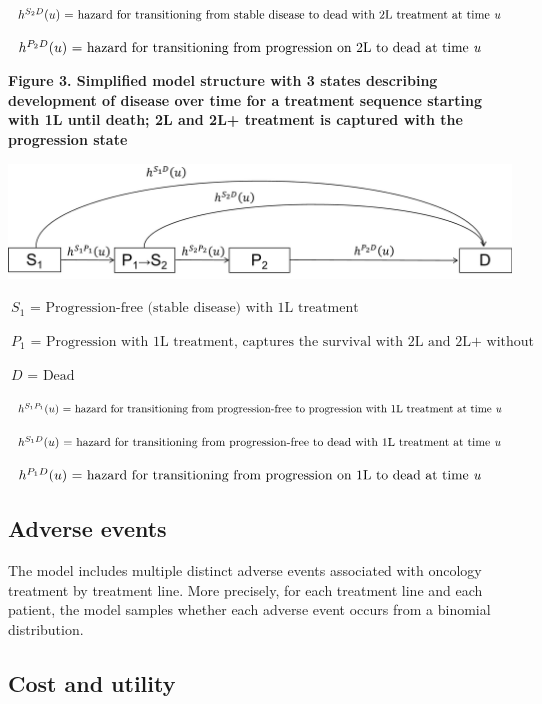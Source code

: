 \documentclass[11pt,final,fleqn]{article}\usepackage[]{graphicx}\usepackage[]{color}
\theoremstyle{plain}
\begin{document}
{$\ h^{S_{2}D} (u) \textrm{ = hazard for transitioning from stable disease to dead with 2L treatment at time \textit{u} } $ 

$\ h^{P_{2}D} (u) \textrm{ = hazard for transitioning from progression on 2L to dead at time \textit{u} } $

\textbf{Figure 3. Simplified model structure with 3 states describing development of disease over time for a treatment sequence starting with 1L until death; 2L and 2L+ treatment is captured with the progression state} 

\includegraphics[scale=0.3]{Figure 3.png} 

$\ S_{1} \textrm{ = Progression-free (stable disease) with 1L treatment }$ 

$\ P_{1} \textrm{ = Progression with 1L treatment, captures the survival with 2L and 2L+ without making a distinction between progression free and progression phases }$ 

$\ D \textrm{ = Dead }$ 

$\ h^{S_{1}P_{1}} (u) \textrm{ = hazard for transitioning from progression-free to progression with 1L treatment at time \textit{u} } $

$\ h^{S_{1}D} (u) \textrm{ = hazard for transitioning from progression-free to dead with 1L treatment at time \textit{u} } $ 

$\ h^{P_{1}D} (u) \textrm{ = hazard for transitioning from progression on 1L to dead at time \textit{u} } $

\subsection{Adverse events}

The model includes multiple distinct adverse events associated with oncology treatment by treatment line. More precisely, for each treatment line and each patient, the model samples whether each adverse event occurs from a binomial distribution.

\subsection{Cost and utility}

}
\end{document}
